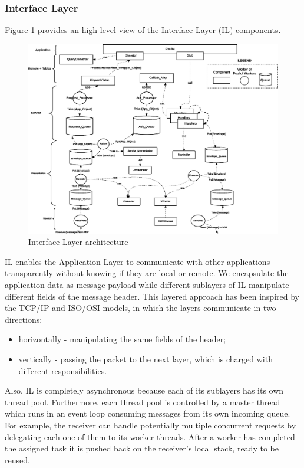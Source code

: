 \subsubsection{Interface Layer}

Figure \ref{fig:impl-il-arch} provides an high level view of
the Interface Layer (IL) components.

\begin{figure}[H]
  \centering
  \includegraphics[width=\columnwidth]{images/solution/il.eps}
  \caption{Interface Layer architecture}
  \label{fig:impl-il-arch}
\end{figure}

IL enables the Application Layer to communicate with other applications
transparently without knowing if they are local or remote. We encapsulate the
application data as message payload while
different sublayers of IL manipulate different fields of the
message header.
This layered approach has been inspired by the TCP/IP and ISO/OSI models, in
which the layers communicate in two directions:
\begin{itemize}
	\item horizontally - manipulating the same fields of the header;
	\item vertically  - passing the packet to the next
layer, which is charged with different responsibilities.
\end{itemize}
Also, IL is completely asynchronous because each of its sublayers has its own
thread pool. Furthermore, each thread pool is controlled by a master thread which
runs in an event loop consuming messages from its own incoming
queue. For example, the receiver can handle potentially multiple concurrent
requests by delegating each one of them to its worker threads.
After a worker has
completed the assigned task it is pushed back on the receiver's local stack,
ready to be reused.


